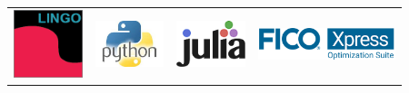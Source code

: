 \documentclass{beamer}
\begin{document}
\begin{frame}
\begin{table}
\begin{tabular}{c c c c}
		\includegraphics[width=2cm,height=2cm]{solver_lingo.png} & 
		\includegraphics[width=2cm,height=2cm]{solver_python.jpg} &
		\includegraphics[width=2cm,height=2cm]{solver_julia.png} &
		\includegraphics[width=4cm,height=2cm]{solver_xpress.png} \\		
		\end{tabular}
	\end{table}
\end{frame}
	
\end{document}
